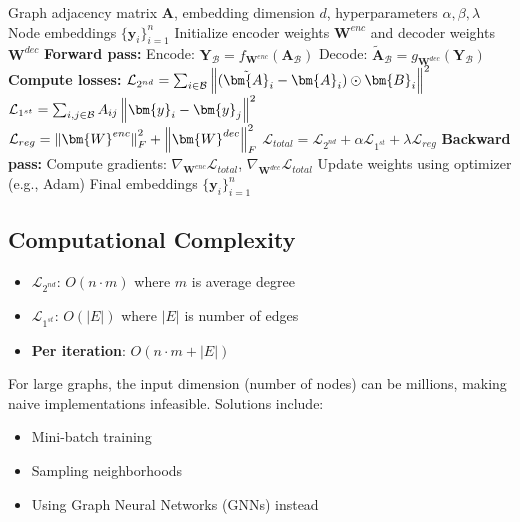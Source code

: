 \begin{notechapter}
\begin{algorithm}
\caption{Training Graph Autoencoder (SDNE)}
\begin{algorithmic}[1]
\Require Graph adjacency matrix $\bm{A}$, embedding dimension $d$, hyperparameters $\alpha, \beta, \lambda$
\Ensure Node embeddings $\{\bm{y}_i\}_{i=1}^n$
\State Initialize encoder weights $\bm{W}^{enc}$ and decoder weights $\bm{W}^{dec}$
        \State \textbf{Forward pass:}
        \State \quad Encode: $\bm{Y}_{\mathcal{B}} = f_{\bm{W}^{enc}}(\bm{A}_{\mathcal{B}})$ 
        \State \quad Decode: $\tilde{\bm{A}}_{\mathcal{B}} = g_{\bm{W}^{dec}}(\bm{Y}_{\mathcal{B}})$ 
        \State
        \State \textbf{Compute losses:}
        \State \quad $\mathcal{L}_{2^{nd}} = \sum_{i \in \mathcal{B}} \norm{(\tilde{\bm{A}}_i - \bm{A}_i) \hadamard \bm{B}_i}^2$
        \State \quad $\mathcal{L}_{1^{st}} = \sum_{i,j \in \mathcal{B}} A_{ij} \norm{\bm{y}_i - \bm{y}_j}^2$
        \State \quad $\mathcal{L}_{reg} = \norm{\bm{W}^{enc}}^2_F + \norm{\bm{W}^{dec}}^2_F$
        \State \quad $\mathcal{L}_{total} = \mathcal{L}_{2^{nd}} + \alpha \mathcal{L}_{1^{st}} + \lambda \mathcal{L}_{reg}$
        \State
        \State \textbf{Backward pass:}
        \State \quad Compute gradients: $\nabla_{\bm{W}^{enc}} \mathcal{L}_{total}$, $\nabla_{\bm{W}^{dec}} \mathcal{L}_{total}$
        \State \quad Update weights using optimizer (e.g., Adam)
    \EndFor
\EndFor
\State \Return Final embeddings $\{\bm{y}_i\}_{i=1}^n$
\end{algorithmic}
\end{algorithm}

\subsection{Computational Complexity}

\begin{itemize}
    \item \textbf{$\mathcal{L}_{2^{nd}}$}: $O(n \cdot m)$ where $m$ is average degree
    \item \textbf{$\mathcal{L}_{1^{st}}$}: $O(|E|)$ where $|E|$ is number of edges
    \item \textbf{Per iteration}: $O(n \cdot m + |E|)$
\end{itemize}

For large graphs, the input dimension (number of nodes) can be millions, making naive implementations infeasible. Solutions include:
\begin{itemize}
    \item Mini-batch training
    \item Sampling neighborhoods
    \item Using Graph Neural Networks (GNNs) instead
\end{itemize}


\end{notechapter}

